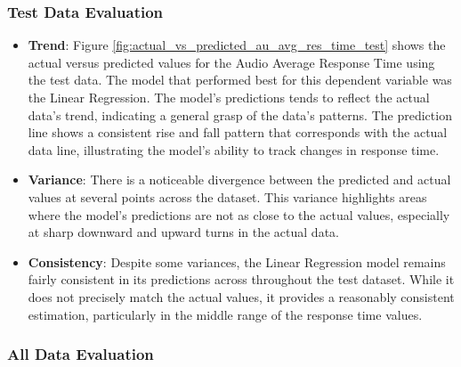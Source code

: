 \subsubsection*{Test Data Evaluation}

\begin{itemize}
    \item \textbf{Trend}: Figure \ref{fig:actual_vs_predicted_au_avg_res_time_test} shows the actual versus predicted values for the Audio Average Response Time using the test data. The model that performed
    best for this dependent variable was the Linear Regression. The model's predictions tends to reflect the actual data's trend, indicating a general grasp of the data's patterns. The prediction line shows 
    a consistent rise and fall pattern that corresponds with the actual data line, illustrating the model's ability to track changes in response time.    
    
    \item \textbf{Variance}: There is a noticeable divergence between the predicted and actual values at several points across the dataset. This variance highlights areas where the model's predictions are not 
    as close to the actual values, especially at sharp downward and upward turns in the actual data.    
    
    \item \textbf{Consistency}: Despite some variances, the Linear Regression model remains fairly consistent in its predictions across throughout the test dataset. While it does not precisely match the actual values, it provides 
    a reasonably consistent estimation, particularly in the middle range of the response time values.

\end{itemize}


\subsubsection*{All Data Evaluation}

